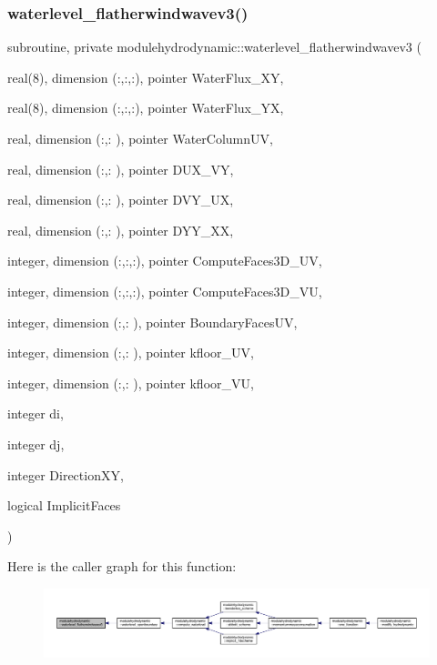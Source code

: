 \subsubsection{\texorpdfstring{waterlevel\+\_\+flatherwindwavev3()}{waterlevel\_flatherwindwavev3()}}
{\footnotesize\ttfamily subroutine, private modulehydrodynamic\+::waterlevel\+\_\+flatherwindwavev3 (\begin{DoxyParamCaption}\item[{real(8), dimension (\+:,\+:,\+:), pointer}]{Water\+Flux\+\_\+\+XY,  }\item[{real(8), dimension (\+:,\+:,\+:), pointer}]{Water\+Flux\+\_\+\+YX,  }\item[{real, dimension (\+:,\+:  ), pointer}]{Water\+Column\+UV,  }\item[{real, dimension (\+:,\+:  ), pointer}]{D\+U\+X\+\_\+\+VY,  }\item[{real, dimension (\+:,\+:  ), pointer}]{D\+V\+Y\+\_\+\+UX,  }\item[{real, dimension (\+:,\+:  ), pointer}]{D\+Y\+Y\+\_\+\+XX,  }\item[{integer, dimension (\+:,\+:,\+:), pointer}]{Compute\+Faces3\+D\+\_\+\+UV,  }\item[{integer, dimension (\+:,\+:,\+:), pointer}]{Compute\+Faces3\+D\+\_\+\+VU,  }\item[{integer, dimension (\+:,\+:  ), pointer}]{Boundary\+Faces\+UV,  }\item[{integer, dimension (\+:,\+:  ), pointer}]{kfloor\+\_\+\+UV,  }\item[{integer, dimension (\+:,\+:  ), pointer}]{kfloor\+\_\+\+VU,  }\item[{integer}]{di,  }\item[{integer}]{dj,  }\item[{integer}]{Direction\+XY,  }\item[{logical}]{Implicit\+Faces }\end{DoxyParamCaption})\hspace{0.3cm}{\ttfamily [private]}}

Here is the caller graph for this function\+:\nopagebreak
\begin{figure}[H]
\begin{center}
\leavevmode
\includegraphics[width=350pt]{namespacemodulehydrodynamic_ae8536b67d3763d371e3025b09e7920a6_icgraph}
\end{center}
\end{figure}
\mbox{\label{namespacemodulehydrodynamic_a25549ff328b3933642ae5a9112a7d2ba}} 

